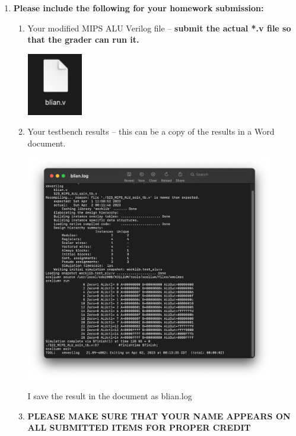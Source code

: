 \documentclass[12pt]{article}
\begin{document}
\begin{enumerate}
\begin{center}
    \end{center}
    \item \textbf{Please include the following for your homework submission:}
    \begin{enumerate}
        \item Your modified MIPS ALU Verilog file – \textbf{submit the actual *.v file so that the grader can run it.}
                        \begin{center}
        \includegraphics[width=0.2\textwidth]{p6.png}
    \end{center}
        \item Your testbench results – this can be a copy of the results in a Word document.\\
    \begin{center}
        \includegraphics[width=0.9\textwidth]{p7.png}
    \end{center}
        I save the result in the document as blian.log
        \item \textbf{PLEASE MAKE SURE THAT YOUR NAME APPEARS ON ALL SUBMITTED ITEMS FOR PROPER CREDIT}
    \end{enumerate}
    
\end{enumerate}
\end{document}
